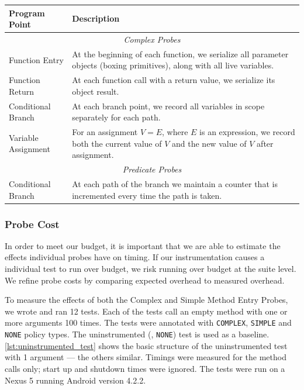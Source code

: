 {\begin{center}
    \begin{tabular}{| l | p{6cm} |}
    \hline
        \textbf{Program Point} & \textbf{Description} \\
    \hline
        \multicolumn{2}{|c|}{\textit{Complex Probes}} \\
    \hline
        Function Entry &
        At the beginning of each function, we serialize all parameter objects
        (boxing primitives), along with all live variables. \\
    \hline
        Function Return &
        At each function call with a return value, we serialize its object
        result. \\
    \hline
        Conditional Branch &
        At each branch point, we record all variables in scope separately for
        each path. \\
    \hline
        Variable Assignment &
        For an assignment $V = E$, where $E$ is an expression, we record both
        the current value of $V$ and the new value of $V$ after assignment. \\
    \hline
        \multicolumn{2}{|c|}{\textit{Predicate Probes}} \\
    \hline
        Conditional Branch &
        At each path of the branch we maintain a counter that is incremented
        every time the path is taken. \\
    \hline

    \end{tabular}
\end{center}

\subsubsection{Probe Cost}

In order to meet our budget, it is important that we are able to estimate the
effects individual probes have on timing. If our instrumentation causes a
individual test to run over budget, we risk running over budget at the suite
level. We refine probe costs by comparing expected overhead to measured
overhead.

To measure the effects of both the Complex and Simple Method Entry Probes, we
wrote and ran 12 tests. Each of the tests call an empty method with one or more
arguments 100 times. The tests were annotated with {\tt COMPLEX}, {\tt SIMPLE}
and {\tt NONE} policy types. The uninstrumented (\ie, {\tt NONE}) test is used
as a baseline. \autoref{lst:uninstrumented_test} shows the basic structure of
the uninstrumented test with 1 argument --- the others similar. Timings were
measured for the method calls only; start up and shutdown times were ignored.
The tests were run on a Nexus 5 running Android version 4.2.2.

}
